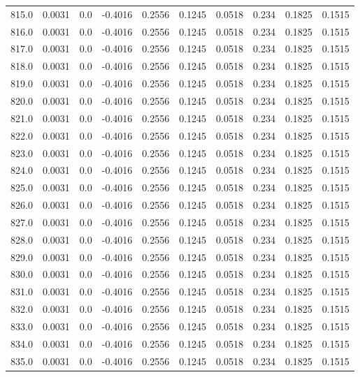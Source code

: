 \begin{longtable}{lrrrrrrrrr}
815.0 & 0.0031 & 0.0 & -0.4016 & 0.2556 & 0.1245 & 0.0518 & 0.234 & 0.1825 & 0.1515 \\
816.0 & 0.0031 & 0.0 & -0.4016 & 0.2556 & 0.1245 & 0.0518 & 0.234 & 0.1825 & 0.1515 \\
817.0 & 0.0031 & 0.0 & -0.4016 & 0.2556 & 0.1245 & 0.0518 & 0.234 & 0.1825 & 0.1515 \\
818.0 & 0.0031 & 0.0 & -0.4016 & 0.2556 & 0.1245 & 0.0518 & 0.234 & 0.1825 & 0.1515 \\
819.0 & 0.0031 & 0.0 & -0.4016 & 0.2556 & 0.1245 & 0.0518 & 0.234 & 0.1825 & 0.1515 \\
820.0 & 0.0031 & 0.0 & -0.4016 & 0.2556 & 0.1245 & 0.0518 & 0.234 & 0.1825 & 0.1515 \\
821.0 & 0.0031 & 0.0 & -0.4016 & 0.2556 & 0.1245 & 0.0518 & 0.234 & 0.1825 & 0.1515 \\
822.0 & 0.0031 & 0.0 & -0.4016 & 0.2556 & 0.1245 & 0.0518 & 0.234 & 0.1825 & 0.1515 \\
823.0 & 0.0031 & 0.0 & -0.4016 & 0.2556 & 0.1245 & 0.0518 & 0.234 & 0.1825 & 0.1515 \\
824.0 & 0.0031 & 0.0 & -0.4016 & 0.2556 & 0.1245 & 0.0518 & 0.234 & 0.1825 & 0.1515 \\
825.0 & 0.0031 & 0.0 & -0.4016 & 0.2556 & 0.1245 & 0.0518 & 0.234 & 0.1825 & 0.1515 \\
826.0 & 0.0031 & 0.0 & -0.4016 & 0.2556 & 0.1245 & 0.0518 & 0.234 & 0.1825 & 0.1515 \\
827.0 & 0.0031 & 0.0 & -0.4016 & 0.2556 & 0.1245 & 0.0518 & 0.234 & 0.1825 & 0.1515 \\
828.0 & 0.0031 & 0.0 & -0.4016 & 0.2556 & 0.1245 & 0.0518 & 0.234 & 0.1825 & 0.1515 \\
829.0 & 0.0031 & 0.0 & -0.4016 & 0.2556 & 0.1245 & 0.0518 & 0.234 & 0.1825 & 0.1515 \\
830.0 & 0.0031 & 0.0 & -0.4016 & 0.2556 & 0.1245 & 0.0518 & 0.234 & 0.1825 & 0.1515 \\
831.0 & 0.0031 & 0.0 & -0.4016 & 0.2556 & 0.1245 & 0.0518 & 0.234 & 0.1825 & 0.1515 \\
832.0 & 0.0031 & 0.0 & -0.4016 & 0.2556 & 0.1245 & 0.0518 & 0.234 & 0.1825 & 0.1515 \\
833.0 & 0.0031 & 0.0 & -0.4016 & 0.2556 & 0.1245 & 0.0518 & 0.234 & 0.1825 & 0.1515 \\
834.0 & 0.0031 & 0.0 & -0.4016 & 0.2556 & 0.1245 & 0.0518 & 0.234 & 0.1825 & 0.1515 \\
835.0 & 0.0031 & 0.0 & -0.4016 & 0.2556 & 0.1245 & 0.0518 & 0.234 & 0.1825 & 0.1515 \\

\end{longtable}
